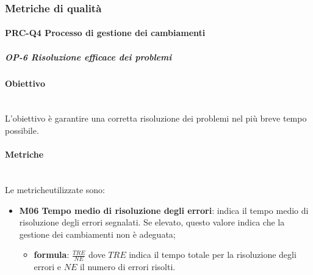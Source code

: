 \subsubsection{Metriche di qualità}
	\paragraph{PRC-Q4 Processo di gestione dei cambiamenti}
		\subparagraph{OP-6 Risoluzione efficace dei problemi}
		\paragraph*{Obiettivo}\mbox{}\\ [1mm]
		L'obiettivo è garantire una corretta risoluzione dei problemi nel più breve tempo possibile.
		\paragraph*{Metriche}\mbox{}\\ [1mm]
		Le metriche\glosp utilizzate sono:
		\begin{itemize}
			\item \textbf{M06 Tempo medio di risoluzione degli errori}: indica il tempo medio di risoluzione degli errori segnalati. Se elevato, questo valore indica che la gestione dei cambiamenti non è adeguata;
			\begin{itemize}
				\item[] \textbf{formula}: $\frac{TRE}{NE}$ dove $TRE$ indica il tempo totale per la risoluzione degli errori e $NE$ il numero di errori risolti.
			\end{itemize} 
		\end{itemize}		
